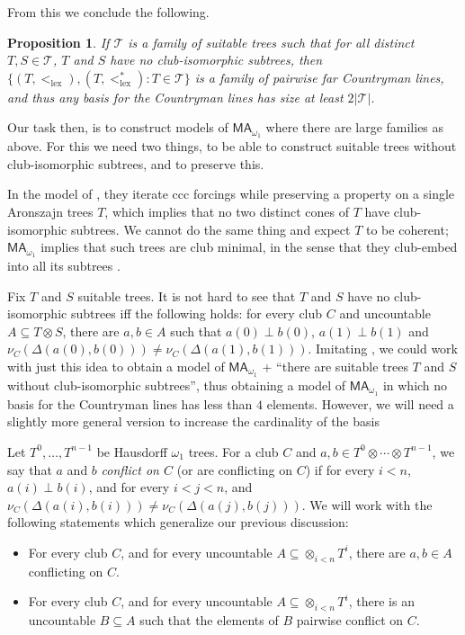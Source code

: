 \documentclass[a4paper,noamsfonts]{amsart}
\newtheorem{proposition}[theorem]{Proposition}
\theoremstyle{definition}
\newcommand{\seb}{\subseteq}
\newcommand{\MA}{\textsf{MA}}
\newcommand{\1}{\mathbf{1}}
\newcommand{\T}{\mathcal{T}}
\newcommand{\prop}{\Xi}
\newcommand{\propp}{\prop^{+}}
\DeclareMathOperator{\lex}{lex}
\begin{document}
From this we conclude the following.

\begin{proposition}\label{prop:basis}
  If $\T$ is a family of suitable trees such that for all distinct
  $T,S \in \T$, $T$ and $S$ have no club-isomorphic subtrees,
  then $\{(T,<_{\lex}),(T,<_{\lex}^{*}) : T \in \T\}$
  is a family of pairwise far
  Countryman lines, and thus any basis for the Countryman lines
  has size at least $2|\T|$.
\end{proposition}

Our task then, is to construct models of $\MA_{\omega_{1}}$
where there are large families as above. For this we need two things,
to be able to construct suitable trees without club-isomorphic subtrees,
and to preserve this.

In the model of \cite{ShelahAbraham}, they iterate ccc forcings while
preserving a property on a single Aronszajn trees
$T$, which implies that no two
distinct cones of $T$ have club-isomorphic subtrees. We cannot do the
same thing and expect $T$ to be coherent;
$\MA_{\omega_{1}}$ implies that such trees are club minimal,
in the sense that they club-embed into all its subtrees \cite{Todorcevic2007}.

Fix $T$ and $S$ suitable trees. It is not hard to see that $T$ and $S$ have no
club-isomorphic subtrees iff the following holds: for every club $C$
and uncountable $A \seb T \otimes S$, there are $a,b \in A$ such that
$a(0) \perp b(0)$, $a(1) \perp b(1)$ and $\nu_{C}(\Delta(a(0),b(0)))
\neq \nu_{C}(\Delta(a(1),b(1)))$.
Imitating \cite{ShelahAbraham}, we could work with just this idea
to obtain a model of $\MA_{\omega_{1}}$ + ``there are suitable
trees $T$ and $S$ without club-isomorphic subtrees'', thus obtaining
a model of $\MA_{\omega_{1}}$ in which no basis for the Countryman lines
has less than $4$ elements. However, we will need a slightly more general
version to increase the cardinality of the basis

Let $T^{0},\dots,T^{n-1}$ be Hausdorff $\omega_{1}$ trees.
For a club $C$ and $a,b \in T^{0} \otimes \cdots \otimes T^{n-1}$, we say that
$a$ and $b$ \emph{conflict on $C$} (or are conflicting on $C$)
if for every $i < n$, $a(i) \perp b(i)$,
and for every $i < j < n$,
and $\nu_{C}(\Delta(a(i),b(i))) \neq \nu_{C}(\Delta(a(j),b(j)))$.
We will work with the following statements which generalize our previous
discussion:

\begin{itemize}[topsep=1em,align=left]
  \item[$\prop(T^{0},\dots,T^{n-1})$]
  For every club $C$, and
  for every uncountable $A \seb \otimes_{i < n}T^{i}$, there are
  $a,b \in A$ conflicting on $C$.
  \item[$\propp(T^{0},\dots,T^{n-1})$]
  For every club $C$, and
  for every uncountable $A \seb \otimes_{i < n}T^{i}$, there is an
  uncountable $B \seb A$ such that the elements of $B$ pairwise conflict
  on $C$.
\end{itemize}
\end{document}
